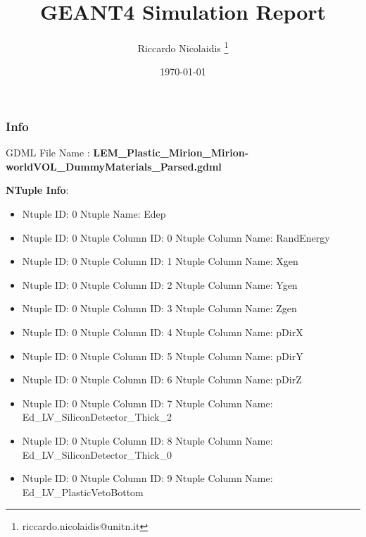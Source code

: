 \documentclass[8pt]{beamer}
\title{GEANT4 Simulation Report}
\author{Riccardo Nicolaidis \footnote{riccardo.nicolaidis@unitn.it}}
\date{\today}
\begin{document}
        
            \begin{frame}
                \titlepage
            \end{frame}
            
            \begin{frame}
                \frametitle{Info}
            
                \centering
                GDML File Name : \textbf{ LEM\_Plastic\_Mirion\_Mirion-worldVOL\_DummyMaterials\_Parsed.gdml}
                
                
                \vspace{2 cm}
                \textbf{NTuple Info}:
                \vspace{1 cm}
                
        \begin{itemize}
        
        \item Ntuple ID: 0 Ntuple Name: Edep
        
        \item Ntuple ID: 0 Ntuple Column ID: 0 Ntuple Column Name: RandEnergy
        
        \item Ntuple ID: 0 Ntuple Column ID: 1 Ntuple Column Name: Xgen
        
        \item Ntuple ID: 0 Ntuple Column ID: 2 Ntuple Column Name: Ygen
        
        \item Ntuple ID: 0 Ntuple Column ID: 3 Ntuple Column Name: Zgen
        
        \item Ntuple ID: 0 Ntuple Column ID: 4 Ntuple Column Name: pDirX
        
        \item Ntuple ID: 0 Ntuple Column ID: 5 Ntuple Column Name: pDirY
        
        \item Ntuple ID: 0 Ntuple Column ID: 6 Ntuple Column Name: pDirZ
        
        \item Ntuple ID: 0 Ntuple Column ID: 7 Ntuple Column Name: Ed\_LV\_SiliconDetector\_Thick\_2
        
        \item Ntuple ID: 0 Ntuple Column ID: 8 Ntuple Column Name: Ed\_LV\_SiliconDetector\_Thick\_0
        
        \item Ntuple ID: 0 Ntuple Column ID: 9 Ntuple Column Name: Ed\_LV\_PlasticVetoBottom
        

\end{itemize}
\end{frame}
\end{document}
